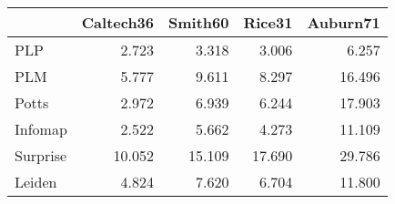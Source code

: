 \begin{tabular}{lrrrr}
\toprule
{} & Caltech36 & Smith60 & Rice31 & Auburn71 \\
\midrule
PLP      &     2.723 &   3.318 &  3.006 &    6.257 \\
PLM      &     5.777 &   9.611 &  8.297 &   16.496 \\
Potts    &     2.972 &   6.939 &  6.244 &   17.903 \\
Infomap  &     2.522 &   5.662 &  4.273 &   11.109 \\
Surprise &    10.052 &  15.109 & 17.690 &   29.786 \\
Leiden   &     4.824 &   7.620 &  6.704 &   11.800 \\
\bottomrule
\end{tabular}
